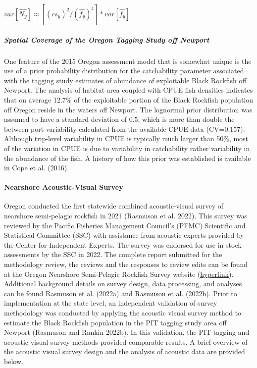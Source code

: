 \documentclass[11pt,
  english,
  letterpaper,
]{article}
\begin{document}
\(var[\hat{N_y}] \approx [(cs_y)^2/(\hat{f_y})^4]*var[\hat{f_y}]\)

\hypertarget{spatial-coverage-of-the-oregon-tagging-study-off-newport}{%
\subparagraph{Spatial Coverage of the Oregon Tagging Study off Newport}\label{spatial-coverage-of-the-oregon-tagging-study-off-newport}}

One feature of the 2015 Oregon assessment model that is somewhat unique is the use of a prior probability distribution for the catchability parameter associated with the tagging study estimates of abundance of exploitable Black Rockfish off Newport. The analysis of habitat area coupled with CPUE fish densities indicates that on average 12.7\% of the exploitable portion of the Black Rockfish population off Oregon reside in the waters off Newport. The lognormal prior distribution was assumed to have a standard deviation of 0.5, which is more than double the between-port variability calculated from the available CPUE data (CV=0.157). Although trip-level variability in CPUE is typically much larger than 50\%, most of the variation in CPUE is due to variability in catchability rather variability in the abundance of the fish. A history of how this prior was established is available in Cope et al. (2016).

\hypertarget{nearshore-acoustic-visual-survey}{%
\paragraph{Nearshore Acoustic-Visual Survey}\label{nearshore-acoustic-visual-survey}}

Oregon conducted the first statewide combined acoustic-visual survey of nearshore semi-pelagic rockfish in 2021 (Rasmuson et al. 2022). This survey was reviewed by the Pacific Fisheries Management Council's (PFMC) Scientific and Statistical Committee (SSC) with assistance from acoustic experts provided by the Center for Independent Experts. The survey was endorsed for use in stock assessments by the SSC in 2022. The complete report submitted for the methodology review, the reviews and the responses to review edits can be found at the Oregon Nearshore Semi-Pelagic Rockfish Survey website (\href{https://nrimp.dfw.state.or.us/DataClearinghouse/default.aspx?p=202\&XMLname=42630.xml}{hyperlink}). Additional background details on survey design, data processing, and analyses can be found Rasmuson et al. (2022a) and Rasmuson et al. (2022b). Prior to implementation at the state level, an independent validation of survey methodology was conducted by applying the acoustic visual survey method to estimate the Black Rockfish population in the PIT tagging study area off Newport (Rasmuson and Rankin 2022b). In this validation, the PIT tagging and acoustic visual survey methods provided comparable results. A brief overview of the acoustic visual survey design and the analysis of acoustic data are provided below.
\end{document}
